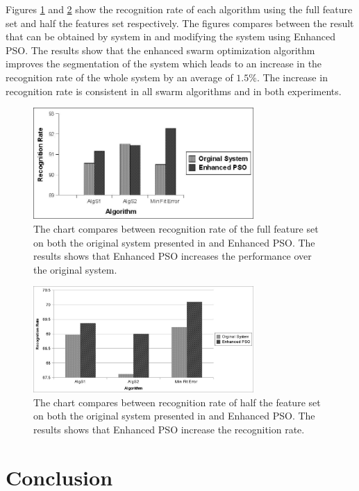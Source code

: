 \documentclass[10pt]{article}
\begin{document}
Figures \ref{exp2} and \ref{exp1} show the recognition rate of each algorithm using the full feature set and half the features set respectively. The figures compares between the result that can be obtained by system in \cite{mypaper} and modifying the system using Enhanced PSO. The results show that the enhanced swarm optimization algorithm improves the segmentation of the system which leads to an increase in the recognition rate of the whole system by an average of $1.5\%$.  The increase in recognition rate is consistent in all swarm algorithms and in both experiments.   
    \begin{figure}
  \centering
  \includegraphics[width=3.3in]{Experiment92.jpg}
  \caption[Recognition accuracy]%
  {The chart compares between recognition rate of the full feature set on both the original system presented in \cite{mypaper} and Enhanced PSO. The results shows that Enhanced PSO increases the performance over the original system. }
   \label{exp2}
\end{figure}
\begin{figure}
  \centering
  \includegraphics[width=3.3in]{Experiment68.jpg}
  \caption[Recognition accuracy]%
  {The chart compares between recognition rate of half the feature set on both the original system presented in \cite{mypaper} and Enhanced PSO. The results shows that Enhanced PSO increase the recognition rate. }
   \label{exp1}
\end{figure}

 
  
\section{Conclusion }
 \label{ConclusionandFutureWork}
\end{document}

